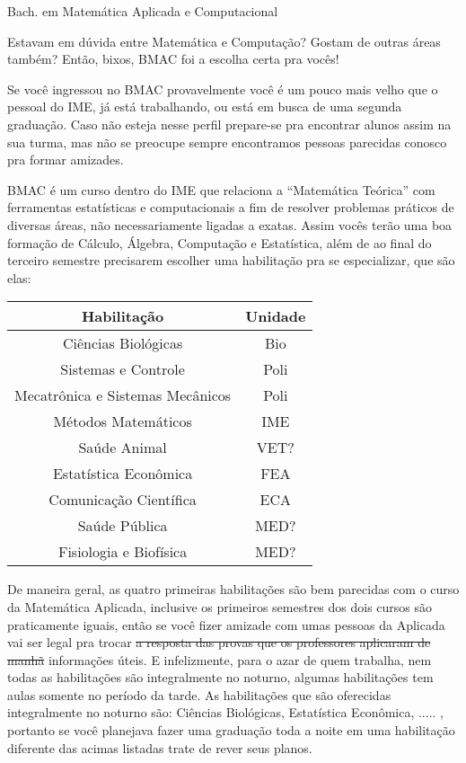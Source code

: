 \begin{subsecao}{Bach. em Matemática Aplicada e Computacional}

Estavam em dúvida entre Matemática e Computação? Gostam de outras áreas também?
Então, bixos, BMAC foi a escolha certa pra vocês!

Se você ingressou no BMAC provavelmente você é um pouco mais velho que o pessoal
do IME, já está trabalhando, ou está em busca de uma segunda graduação. Caso não
esteja nesse perfil prepare-se pra encontrar alunos assim na sua turma, mas não se
preocupe sempre encontramos pessoas parecidas conosco pra formar amizades.

BMAC é um curso dentro do IME que relaciona a ``Matemática Teórica'' com
ferramentas estatísticas e computacionais a fim de resolver problemas práticos
de diversas áreas, não necessariamente ligadas a exatas. Assim vocês terão uma boa
formação de Cálculo, Álgebra, Computação e Estatística, além de ao final do terceiro
semestre precisarem escolher uma habilitação pra se especializar, que são elas:

\begin {center}
  \begin {tabular}{|c|c|}
    Habilitação & Unidade \\
    \hline
    Ciências Biológicas & Bio\\
    Sistemas e Controle & Poli\\
    Mecatrônica e Sistemas Mecânicos & Poli\\
    Métodos Matemáticos & IME\\
    Saúde Animal & VET? \\
    Estatística Econômica & FEA \\
    Comunicação Científica & ECA \\
    Saúde Pública & MED? \\
    Fisiologia e Biofísica & MED? \\
  \end {tabular}
\end {center}

De maneira geral, as quatro primeiras habilitações são bem parecidas com o curso da Matemática
Aplicada, inclusive os primeiros semestres dos dois cursos são praticamente iguais,
então se você fizer amizade com umas pessoas da Aplicada vai ser legal pra trocar
\sout{a resposta das provas que os professores aplicaram de manhã} informações úteis.
E infelizmente, para o azar de quem trabalha, nem todas as habilitações são integralmente
no noturno, algumas habilitações tem aulas somente no período da tarde. As habilitações
que são oferecidas integralmente no noturno são: Ciências Biológicas, Estatística Econômica,
..... , portanto se você planejava fazer uma graduação toda a noite em uma habilitação
diferente das acimas listadas trate de rever seus planos.


\end{subsecao}

